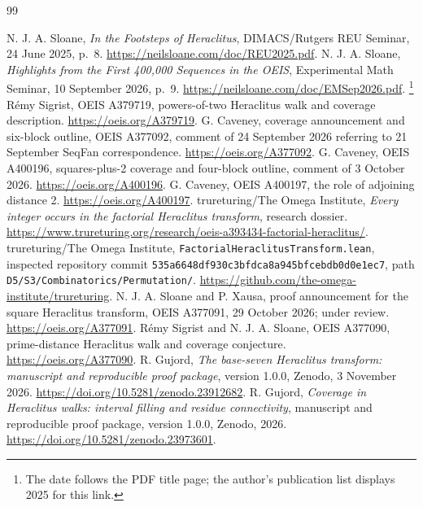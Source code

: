 \documentclass[11pt,a4paper]{article}
\newcommand{\code}[1]{\texttt{#1}}
\begin{document}
\begin{thebibliography}{99}\small\raggedright
{} N. J. A. Sloane, \emph{In the Footsteps of Heraclitus},
DIMACS/Rutgers REU Seminar, 24 June 2025, p.~8.
\url{https://neilsloane.com/doc/REU2025.pdf}.
 N. J. A. Sloane, \emph{Highlights from the First 400,000
Sequences in the OEIS}, Experimental Math Seminar, 10 September 2026, p.~9.
\url{https://neilsloane.com/doc/EMSep2026.pdf}.
\footnote{The date follows the PDF title page; the author's publication
list displays 2025 for this link.}
 R\'emy Sigrist, OEIS A379719,
powers-of-two Heraclitus walk and coverage description.
\url{https://oeis.org/A379719}.
 G. Caveney, coverage announcement and six-block outline,
OEIS A377092, comment of 24 September 2026 referring to 21 September
SeqFan correspondence. \url{https://oeis.org/A377092}.
 G. Caveney, OEIS A400196, squares-plus-2 coverage and
four-block outline, comment of 3 October 2026.
\url{https://oeis.org/A400196}.
 G. Caveney, OEIS A400197, the role of adjoining distance 2.
\url{https://oeis.org/A400197}.
 trureturing/The Omega Institute, \emph{Every integer
occurs in the factorial Heraclitus transform}, research dossier.
\url{https://www.trureturing.org/research/oeis-a393434-factorial-heraclitus/}.
 trureturing/The Omega Institute,
\code{FactorialHeraclitusTransform.lean}, inspected repository commit
\code{535a6648df930c3bfdca8a945bfcebdb0d0e1ec7}, path
\code{D5/S3/Combinatorics/Permutation/}.
\url{https://github.com/the-omega-institute/trureturing}.
 N. J. A. Sloane and P. Xausa, proof announcement for the
square Heraclitus transform, OEIS A377091, 29 October 2026; under review.
\url{https://oeis.org/A377091}.
 R\'emy Sigrist and N. J. A. Sloane, OEIS A377090,
prime-distance Heraclitus walk and coverage conjecture.
\url{https://oeis.org/A377090}.
 R. Gujord, \emph{The base-seven Heraclitus transform:
manuscript and reproducible proof package}, version 1.0.0, Zenodo,
3 November 2026. \url{https://doi.org/10.5281/zenodo.23912682}.
 R. Gujord, \emph{Coverage in Heraclitus walks: interval
filling and residue connectivity}, manuscript and reproducible proof package,
version 1.0.0, Zenodo, 2026.
\url{https://doi.org/10.5281/zenodo.23973601}.
\end{thebibliography}
\end{document}
